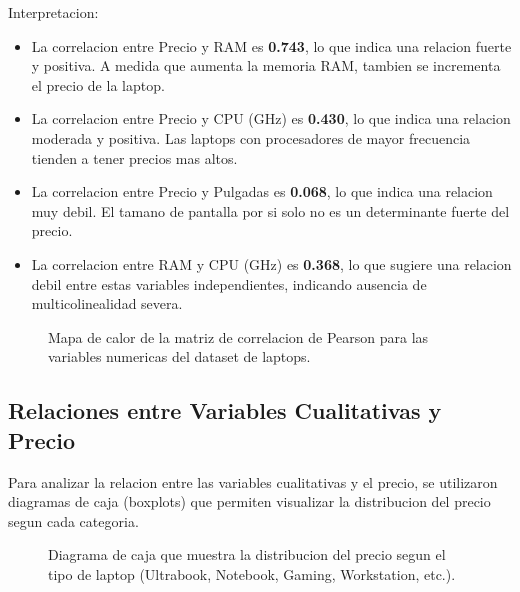 \documentclass[12pt,a4paper]{article}
\begin{document}
Interpretacion:
\begin{itemize}
    \item La correlacion entre Precio y RAM es \textbf{0.743}, lo que indica una relacion fuerte y positiva. A medida que aumenta la memoria RAM, tambien se incrementa el precio de la laptop.
    
    \item La correlacion entre Precio y CPU (GHz) es \textbf{0.430}, lo que indica una relacion moderada y positiva. Las laptops con procesadores de mayor frecuencia tienden a tener precios mas altos.
    
    \item La correlacion entre Precio y Pulgadas es \textbf{0.068}, lo que indica una relacion muy debil. El tamano de pantalla por si solo no es un determinante fuerte del precio.
    
    \item La correlacion entre RAM y CPU (GHz) es \textbf{0.368}, lo que sugiere una relacion debil entre estas variables independientes, indicando ausencia de multicolinealidad severa.
\end{itemize}

\begin{figure}[H]
    \centering
    \caption{Mapa de calor de la matriz de correlacion de Pearson para las variables numericas del dataset de laptops.}
    \label{fig:correlacion}
\end{figure}

\subsection{Relaciones entre Variables Cualitativas y Precio}

Para analizar la relacion entre las variables cualitativas y el precio, se utilizaron diagramas de caja (boxplots) que permiten visualizar la distribucion del precio segun cada categoria.

\begin{figure}[H]
    \centering
    \caption{Diagrama de caja que muestra la distribucion del precio segun el tipo de laptop (Ultrabook, Notebook, Gaming, Workstation, etc.).}
    \label{fig:tipo}
\end{figure}
\end{document}
